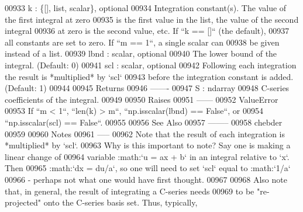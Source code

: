 \begin{DoxyCode}
00933 \textcolor{stringliteral}{    k : \{[], list, scalar\}, optional}
00934 \textcolor{stringliteral}{        Integration constant(s).  The value of the first integral at zero}
00935 \textcolor{stringliteral}{        is the first value in the list, the value of the second integral}
00936 \textcolor{stringliteral}{        at zero is the second value, etc.  If ``k == []`` (the default),}
00937 \textcolor{stringliteral}{        all constants are set to zero.  If ``m == 1``, a single scalar can}
00938 \textcolor{stringliteral}{        be given instead of a list.}
00939 \textcolor{stringliteral}{    lbnd : scalar, optional}
00940 \textcolor{stringliteral}{        The lower bound of the integral. (Default: 0)}
00941 \textcolor{stringliteral}{    scl : scalar, optional}
00942 \textcolor{stringliteral}{        Following each integration the result is *multiplied* by `scl`}
00943 \textcolor{stringliteral}{        before the integration constant is added. (Default: 1)}
00944 \textcolor{stringliteral}{}
00945 \textcolor{stringliteral}{    Returns}
00946 \textcolor{stringliteral}{    -------}
00947 \textcolor{stringliteral}{    S : ndarray}
00948 \textcolor{stringliteral}{        C-series coefficients of the integral.}
00949 \textcolor{stringliteral}{}
00950 \textcolor{stringliteral}{    Raises}
00951 \textcolor{stringliteral}{    ------}
00952 \textcolor{stringliteral}{    ValueError}
00953 \textcolor{stringliteral}{        If ``m < 1``, ``len(k) > m``, ``np.isscalar(lbnd) == False``, or}
00954 \textcolor{stringliteral}{        ``np.isscalar(scl) == False``.}
00955 \textcolor{stringliteral}{}
00956 \textcolor{stringliteral}{    See Also}
00957 \textcolor{stringliteral}{    --------}
00958 \textcolor{stringliteral}{    chebder}
00959 \textcolor{stringliteral}{}
00960 \textcolor{stringliteral}{    Notes}
00961 \textcolor{stringliteral}{    -----}
00962 \textcolor{stringliteral}{    Note that the result of each integration is *multiplied* by `scl`.}
00963 \textcolor{stringliteral}{    Why is this important to note?  Say one is making a linear change of}
00964 \textcolor{stringliteral}{    variable :math:`u = ax + b` in an integral relative to `x`.  Then}
00965 \textcolor{stringliteral}{    :math:`dx = du/a`, so one will need to set `scl` equal to :math:`1/a`}
00966 \textcolor{stringliteral}{    - perhaps not what one would have first thought.}
00967 \textcolor{stringliteral}{}
00968 \textcolor{stringliteral}{    Also note that, in general, the result of integrating a C-series needs}
00969 \textcolor{stringliteral}{    to be "re-projected" onto the C-series basis set.  Thus, typically,}

\end{DoxyCode}
